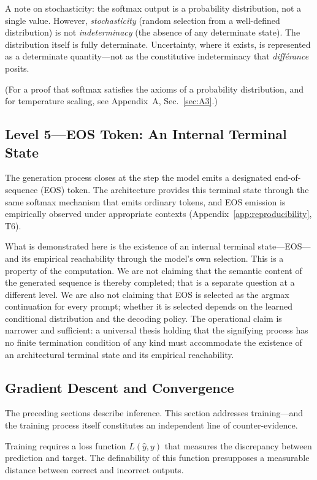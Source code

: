 \documentclass[a4paper,twocolumn,11pt]{article}
\begin{document}
A note on stochasticity: the softmax output is a probability distribution, not a single value. However, \emph{stochasticity} (random selection from a well-defined distribution) is not \emph{indeterminacy} (the absence of any determinate state). The distribution itself is fully determinate. Uncertainty, where it exists, is represented as a determinate quantity---not as the constitutive indeterminacy that \emph{diff\'erance} posits.

(For a proof that softmax satisfies the axioms of a probability distribution, and for temperature scaling, see Appendix~A, Sec.~\ref{sec:A3}.)

\subsection{Level 5---EOS Token: An Internal Terminal State}
\label{sec:eos}

The generation process closes at the step the model emits a designated end-of-sequence (EOS) token. The architecture provides this terminal state through the same softmax mechanism that emits ordinary tokens, and EOS emission is empirically observed under appropriate contexts (Appendix~\ref{app:reproducibility}, T6).

What is demonstrated here is the existence of an internal terminal state---EOS---and its empirical reachability through the model's own selection. This is a property of the computation. We are not claiming that the semantic content of the generated sequence is thereby completed; that is a separate question at a different level. We are also not claiming that EOS is selected as the argmax continuation for every prompt; whether it is selected depends on the learned conditional distribution and the decoding policy. The operational claim is narrower and sufficient: a universal thesis holding that the signifying process has no finite termination condition of any kind must accommodate the existence of an architectural terminal state and its empirical reachability.

\subsection{Gradient Descent and Convergence}
\label{sec:gradient}

The preceding sections describe inference. This section addresses training---and the training process itself constitutes an independent line of counter-evidence.

Training requires a loss function $L(\hat{y}, y)$ that measures the discrepancy between prediction and target. The definability of this function presupposes a measurable distance between correct and incorrect outputs.
\end{document}
